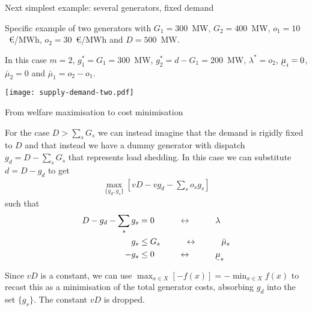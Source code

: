\documentclass[10pt,aspectratio=169,dvipsnames]{beamer}
\def\l{\lambda}
\def\m{\mu}
\newcommand{\ubar}[1]{\text{\b{$#1$}}}
\begin{document}
\begin{frame}{Next simplest example: several generators, fixed demand}

  Specific example of two generators with $G_1 = 300$~MW, $G_2 =
  400$~MW, $o_1 = 10$~\euro/MWh, $o_2 = 30$~\euro/MWh and $D = 500$~MW.

  In this case $m=2$, $g_1^* = G_1 = 300$~MW, $g_2^* = d - G_1 = 200$~MW,
  $\l^* = o_2$, $\ubar{\m}_i = 0$, $\bar{\m}_2 = 0$ and $\bar{\m}_1 =
  o_2 - o_1$.

  \centering
  \texttt{[image: supply-demand-two.pdf]}




\end{frame}





\begin{frame}{From welfare maximisation to cost minimisation}

  For the case $D > \sum_s G_s$ we can instead imagine that the demand
  is rigidly fixed to $D$ and that instead we have a dummy generator
  with dispatch $g_d = D-\sum_s G_s$ that represents \alert{load shedding}.
  In this case we can substitute $d = D - g_d$ to get
  \begin{align*}
    \max_{\{g_d, g_s\}}  \left[ vD - vg_d  -  \sum_s o_s g_s \right]
  \end{align*}
  such that
  \begin{align*}
    D - g_d -  \sum_s g_s  & = 0 \hspace{1cm} \leftrightarrow \hspace{1cm} \l \\
        g_s  & \leq  G_s  \hspace{1cm}\leftrightarrow\hspace{1cm} \bar{\m}_s \\
    - g_s  & \leq  0  \hspace{1cm}\leftrightarrow\hspace{1cm} \ubar{\m}_s
  \end{align*}

  Since $vD$ is a constant, we can use
      $\max_{x\in X} \left[ -f(x)\right] = - \min_{x\in X} f(x)$
  to recast this as a minimisation of the total generator costs,
  absorbing $g_d$ into the set $\{g_s\}$. The constant $vD$ is dropped.

\end{frame}
\end{document}
